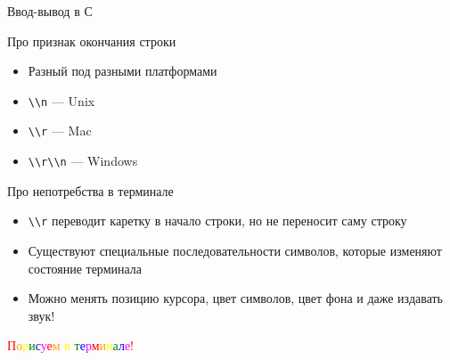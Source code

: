 \documentclass[10pt,pdf,hyperref={unicode}]{beamer}
\begin{document}
\begin{frame}
    \center\huge{Ввод-вывод в С}
\end{frame}

\begin{frame}
\end{frame}

\begin{frame}{Про признак окончания строки}
    \begin{itemize}
        \item Разный под разными платформами
        \item \lstinline{\\n} — Unix
        \item \lstinline{\\r} — Mac
        \item \lstinline{\\r\\n} — Windows
    \end{itemize}
\end{frame}

\begin{frame}{Про непотребства в терминале}
    \begin{itemize}
        \item \lstinline{\\r} переводит каретку в начало строки, но не переносит саму строку
        \item Существуют специальные последовательности символов, которые изменяют состояние терминала
        \item Можно менять позицию курсора, цвет символов, цвет фона и даже издавать звук!
    \end{itemize}
\end{frame}

\begin{frame}
    \center\huge{\textcolor{red}{П}\textcolor{orange}{о}\textcolor{yellow}{р}\textcolor{green}{и}\textcolor{blue}{с}\textcolor{magenta}{у}\textcolor{red}{е}\textcolor{orange}{м}
\textcolor{yellow}{в}
\textcolor{green}{т}\textcolor{blue}{е}\textcolor{magenta}{р}\textcolor{red}{м}\textcolor{orange}{и}\textcolor{yellow}{н}\textcolor{green}{а}\textcolor{blue}{л}\textcolor{magenta}{е}\textcolor{red}{!}}
\end{frame}
\end{document}
